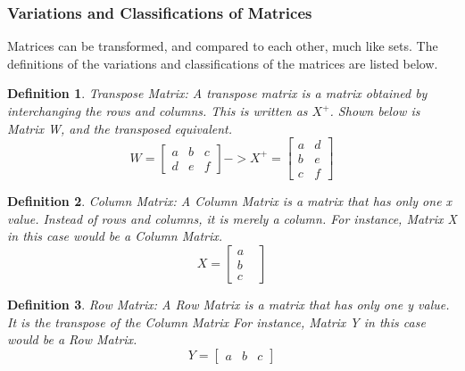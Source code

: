 \documentclass[final,1p,12pt]{elsarticle}
\newtheorem{definition}{Definition}
\begin{document}
        \subsubsection{Variations and Classifications of Matrices}
        Matrices can be transformed, and compared to each other, much like sets. The definitions of the variations and classifications of the matrices are listed below.
        
        \begin{definition}Transpose Matrix: 
            A transpose matrix is a matrix obtained by interchanging the rows and columns. This is written as $X^{+}$. Shown below is Matrix W, and the transposed equivalent.
            \begin{equation}
                W =
                \begin{bmatrix}
                    a & b & c \\
                    d & e & f
                \end{bmatrix}
                -> X^{+} =
                \begin{bmatrix}
                    a & d \\
                    b & e \\
                    c & f
                \end{bmatrix}
            \end{equation}
        \end{definition}
        
        \begin{definition}Column Matrix:
        A Column Matrix is a matrix that has only one x value. Instead of rows and columns, it is merely a column. For instance, Matrix X in this case would be a Column Matrix.
        \begin{equation}%
            X =
            \begin{bmatrix}
                a&\\
                b&\\
                c
            \end{bmatrix}
        \end{equation}
        \end{definition}
        
        \begin{definition}Row Matrix:
        A Row Matrix is a matrix that has only one y value. It is the transpose of the Column Matrix For instance, Matrix Y in this case would be a Row Matrix.
        \begin{equation}%
            Y =
            \begin{bmatrix}
                a & b & c
            \end{bmatrix}
        \end{equation}
        \end{definition}
        
\end{document}
